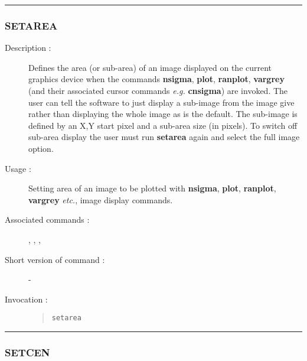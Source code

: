 \hrule
\subsubsection*{\label{SETAREA}SETAREA}

\begin{description}

\item[Description :] Defines the area (or sub-area) of an image
displayed on the current graphics device when the commands {\bf
nsigma}, {\bf plot}, {\bf ranplot}, {\bf vargrey} (and their associated
cursor commands \emph{e.g.} {\bf cnsigma}) are invoked.  The user can
tell the software to just display a sub-image from the image give
rather than displaying the whole image as is the default.  The
sub-image is defined by an X,Y start pixel and a sub-area size (in
pixels).  To switch off sub-area display the user must run {\bf
setarea} again and select the full image option.

\item[Usage :] Setting area of an image to be plotted with {\bf nsigma},
{\bf plot}, {\bf ranplot}, {\bf vargrey} \emph{etc.}, image display commands.

\item[Associated commands :] {\tt {}},
{\tt {}}, {\tt {}},
{\tt {}}

\item[Short version of command :] -
\item[Invocation :]

\begin{quote}{\tt  setarea }\end{quote}

\end{description}

\hrule
\subsubsection*{\label{SETCEN}SETCEN}

